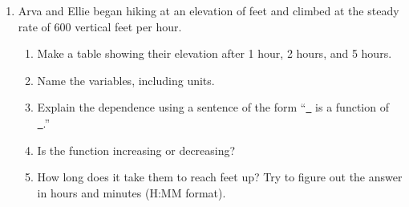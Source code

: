 \documentclass[12pt]{article}
\begin{document}
\begin{enumerate}
 
 \item Arva and Ellie began hiking at an elevation of  feet and climbed at the steady rate of 600 vertical feet per hour. %
\begin{enumerate}
\item Make a table showing their elevation after 1 hour, 2 hours, and 5 hours. \vfill \vfill
\item Name the variables, including units. \vfill \vfill
\item Explain the dependence using a sentence of the form ``\underline{~\quad} is a function of \underline{~\quad}.'' \vfill
\item Is the function increasing or decreasing? \vfill
\item How long does it take them to reach  feet up?  Try to figure out the answer in hours and minutes (H:MM format). \vfill \vfill \vfill
\end{enumerate}


\newpage


\end{enumerate}
\end{document}
